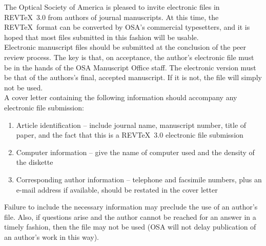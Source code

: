      The Optical Society of America is pleased to invite
electronic files in REV\TeX\ 3.0 from authors of journal
manuscripts.  At this time, the REV\TeX\ format can be converted by
OSA's commercial typesetters, and it is hoped that most files
submitted in this fashion will be usable. \\

     Electronic manuscript files should be submitted at the
conclusion of the peer review process.  The key is that, on
acceptance, the author's electronic file must be in the hands of
the OSA Manuscript Office staff.  The electronic version must be
that of the authors's final, accepted manuscript.  If it is not,
the file will simply not be used.         \\

   A cover letter containing the following information should
accompany any electronic file submission:
\begin{itemize}
  \begin{enumerate}

  \item   Article identification -- include journal name,
          manuscript number, title of paper, and the fact that
          this is a REV\TeX\ 3.0 electronic file submission

  \item   Computer information --  give the name of computer used
          and the density of the diskette

  \item   Corresponding author information -- telephone and
          facsimile numbers, plus an e-mail address if available,
          should be restated in the cover letter
  \end{enumerate}
\end{itemize}

     Failure to include the necessary information may preclude
the use of an author's file.  Also, if questions arise and the
author cannot be reached for an answer in a timely fashion, then
the file may not be used (OSA will not delay publication of an
author's work in this way).  \\

